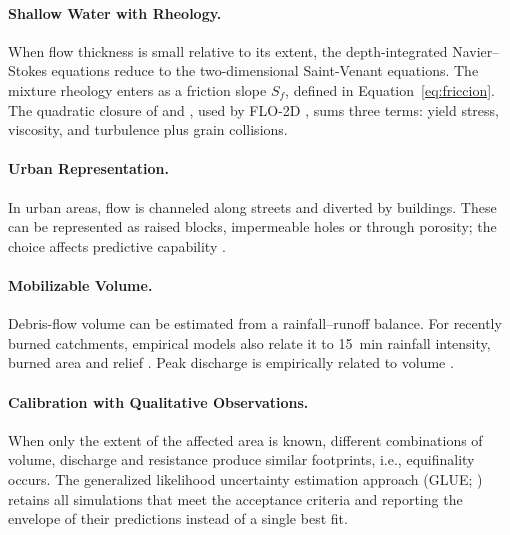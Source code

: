 \paragraph{Shallow Water with Rheology.} When flow thickness is small relative to its extent, the depth-integrated Navier--Stokes equations reduce to the two-dimensional Saint-Venant equations. The mixture rheology enters as a friction slope $S_f$, defined in Equation~\eqref{eq:friccion}. The quadratic closure of \citet{obrien1988} and \citet{obrien1993}, used by FLO-2D \citep{flo2d2021}, sums three terms: yield stress, viscosity, and turbulence plus grain collisions.

\paragraph{Urban Representation.} In urban areas, flow is channeled along streets and diverted by buildings. These can be represented as raised blocks, impermeable holes or through porosity; the choice affects predictive capability \citep{schubert2012}.

\paragraph{Mobilizable Volume.} Debris-flow volume can be estimated from a rainfall--runoff balance. For recently burned catchments, empirical models also relate it to \SI{15}{min} rainfall intensity, burned area and relief \citep{gartner2014}. Peak discharge is empirically related to volume \citep{mizuyama1992}.

\paragraph{Calibration with Qualitative Observations.} When only the extent of the affected area is known, different combinations of volume, discharge and resistance produce similar footprints, i.e., equifinality occurs. The generalized likelihood uncertainty estimation approach (GLUE; \citealp{beven1992}) retains all simulations that meet the acceptance criteria and reporting the envelope of their predictions instead of a single best fit.
